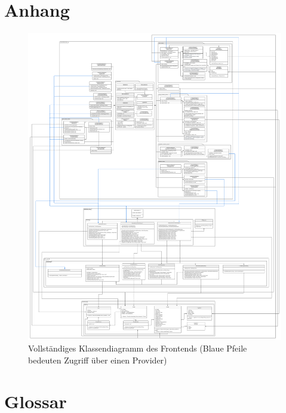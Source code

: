 \documentclass{entwurfsheft}
\begin{document}
\section{Anhang}
\begin{figure}[htp]
    \centering
    \includegraphics[width = .93\textwidth]{images/appendix/classDiagramFrontend.pdf}
    \caption{Vollständiges Klassendiagramm des Frontends (Blaue Pfeile bedeuten Zugriff über einen Provider)}
    \label{fig:classDiagramFrontend}
\end{figure}
\newpage
\section{Glossar}
\printglossary[style=altlist]
\end{document}

